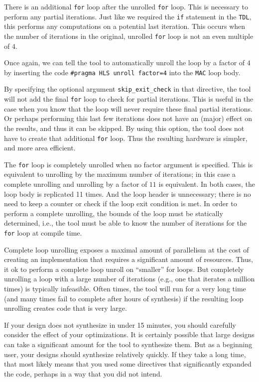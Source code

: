There is an additional \lstinline{for} loop after the unrolled \lstinline{for} loop. This is necessary to perform any partial iterations. Just like we required the \lstinline{if} statement in the \lstinline{TDL}, this performs any computations on a potential last iteration. This occurs when the number of iterations in the original, unrolled \lstinline{for} loop is not an even multiple of $4$. 

Once again, we can tell the \VHLS tool to automatically unroll the loop by a factor of $4$ by inserting the code \lstinline{#pragma HLS unroll factor=4} into the \lstinline{MAC} loop body. 

By specifying the optional argument \lstinline{skip_exit_check} in that directive, the \VHLS tool will not add the final \lstinline{for} loop to check for partial iterations. This is useful in the case when you know that the loop will never require these final partial iterations. Or perhaps performing this last few iterations does not have an (major) effect on the results, and thus it can be skipped. By using this option, the \VHLS tool does not have to create that additional \lstinline{for} loop. Thus the resulting hardware is simpler, and more area efficient.

The \lstinline{for} loop is completely unrolled when no factor argument is specified. This is equivalent to unrolling by the maximum number of iterations; in this case a complete unrolling and unrolling by a factor of $11$ is equivalent. In both cases, the loop body is replicated 11 times. And the loop header is unnecessary; there is no need to keep a counter or check if the loop exit condition is met. In order to perform a complete unrolling, the bounds of the loop must be statically determined, i.e., the \VHLS tool must be able to know the number of iterations for the \lstinline{for} loop at compile time.

Complete loop unrolling exposes a maximal amount of parallelism at the cost of creating an implementation that requires a significant amount of resources. Thus, it ok to perform a complete loop unroll on ``smaller'' for loops. But completely unrolling a loop with a large number of iterations (e.g., one that iterates a million times) is typically infeasible. Often times, the \VHLS tool will run for a very long time (and many times fail to complete after hours of synthesis) if the resulting loop unrolling creates code that is very large. 

\begin{aside}
If your design does not synthesize in under 15 minutes, you should carefully consider the effect of your optimizations. It is certainly possible that large designs can take a significant amount for the \VHLS tool to synthesize them. But as a beginning user, your designs should synthesize relatively quickly.  If they take a long time, that most likely means that you used some directives that significantly expanded the code, perhaps in a way that you did not intend.
\end{aside}

